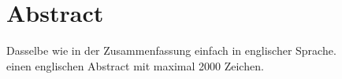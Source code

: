 \newpage
\section*{Abstract}
Dasselbe wie in der Zusammenfassung einfach in englischer Sprache.\\
einen englischen Abstract mit maximal 2000 Zeichen.

